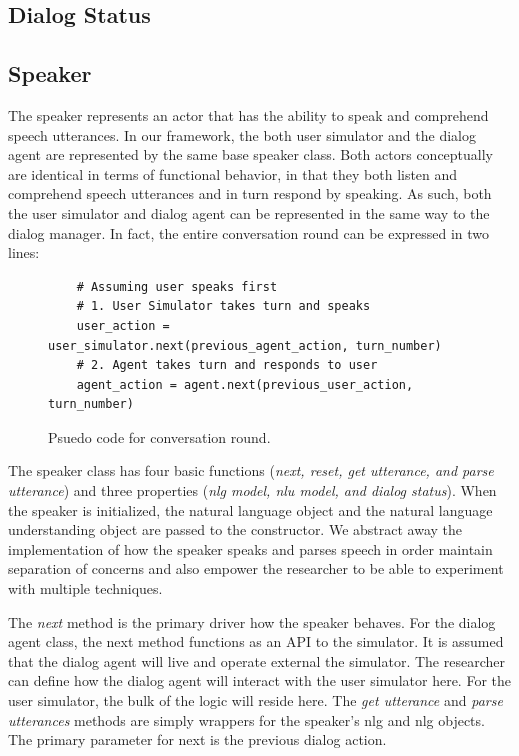 \subsection{Dialog Status}


\subsection{Speaker}

The speaker represents an actor that has the ability to speak and comprehend speech utterances. In our framework, the both user simulator and the dialog agent are represented by the same base speaker class. Both actors conceptually are identical in terms of functional behavior, in that they both listen and comprehend speech utterances and in turn respond by speaking. As such, both the user simulator and dialog agent can be represented in the same way to the dialog manager. In fact, the entire conversation round can be expressed in two lines: 

\begin{figure}[h!]
	\caption{Psuedo code for conversation round.}
	\label{fig:conv_round}
	\begin{lstlisting}
	# Assuming user speaks first 
	# 1. User Simulator takes turn and speaks
	user_action = user_simulator.next(previous_agent_action, turn_number)
	# 2. Agent takes turn and responds to user 
	agent_action = agent.next(previous_user_action, turn_number)
	\end{lstlisting}
\end{figure}

The speaker class has four basic functions (\textit{next, reset, get utterance, and parse utterance}) and three properties (\textit{nlg model, nlu model, and dialog status}). When the speaker is initialized, the natural language object and the natural language understanding object are passed to the constructor. We abstract away the implementation of how the speaker speaks and parses speech in order maintain separation of concerns and also empower the researcher to be able to experiment with multiple techniques. 

The \textit{next} method is the primary driver how the speaker behaves. For the dialog agent class, the next method functions as an API to the simulator. It is assumed that the dialog agent will live and operate external the simulator. The researcher can define how the dialog agent will interact with the user simulator here. For the user simulator, the bulk of the logic will reside here. The \textit{get utterance} and \textit{parse utterances} methods are simply wrappers for the speaker's nlg and nlg objects. The primary parameter for next is the previous dialog action. 

